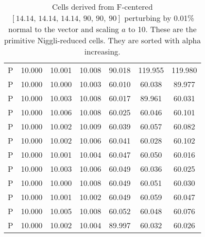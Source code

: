 \documentclass[preprint]{iucr}              %
\begin{document}
{%

\onecolumn

\begin{table}
	\caption{Cells derived from F-centered $ [ 14.14,\, 14.14,\, 14.14,\, 90,\, 90,\ 90 ]$ perturbing 
		by 0.01\% normal to the vector and scaling $a$ to 10.  These are the primitive Niggli-reduced
		cells. They are sorted with alpha increasing.}
	\label{table::fcent}
	\begin{tabular}{l c c c c c c}
                P&  10.000&  10.001&  10.008&  90.018&  119.955& 119.980\\
                P&  10.000&  10.000&  10.003&  60.010&  60.038&  89.977\\
                P&  10.000&  10.003&  10.008&  60.017&  89.961&  60.031\\
                P&  10.000&  10.006&  10.008&  60.025&  60.046&  60.101\\
                P&  10.000&  10.002&  10.009&  60.039&  60.057&  60.082\\
                P&  10.000&  10.002&  10.006&  60.041&  60.028&  60.102\\
                P&  10.000&  10.001&  10.004&  60.047&  60.050&  60.016\\
                P&  10.000&  10.003&  10.006&  60.049&  60.036&  60.025\\
                P&  10.000&  10.000&  10.008&  60.049&  60.051&  60.030\\
                P&  10.000&  10.001&  10.002&  60.049&  60.059&  60.047\\
                P&  10.000&  10.005&  10.008&  60.052&  60.048&  60.076\\
                P&  10.000&  10.002&  10.004&  89.997&  60.032&  60.026\\

\end{tabular}
\end{table}}
\end{document}
